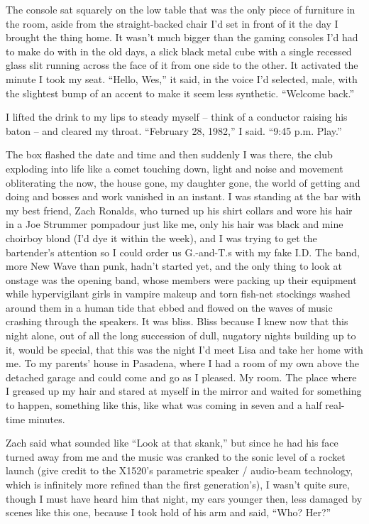 \documentclass[11pt,a4paper]{article}
\newcommand{\qm}[1]{“#1”}
\begin{document}
The console sat squarely on the low table that was the only piece of furniture in the room, aside from the straight-backed chair I'd set in front of it the day I brought the thing home. It wasn't much bigger than the gaming consoles I'd had to make do with in the old days, a slick black metal cube with a single recessed glass slit running across the face of it from one side to the other. It activated the minute I took my seat. \qm{Hello, Wes,} it said, in the voice I'd selected, male, with the slightest bump of an accent to make it seem less synthetic. \qm{Welcome back.}

I lifted the drink to my lips to steady myself – think of a conductor raising his baton – and cleared my throat. \qm{February 28, 1982,} I said. \qm{9:45 p.m. Play.}

The box flashed the date and time and then suddenly I was there, the club exploding into life like a comet touching down, light and noise and movement obliterating the now, the house gone, my daughter gone, the world of getting and doing and bosses and work vanished in an instant. I was standing at the bar with my best friend, Zach Ronalds, who turned up his shirt collars and wore his hair in a Joe Strummer pompadour just like me, only his hair was black and mine choirboy blond (I'd dye it within the week), and I was trying to get the bartender's attention so I could order us G.-and-T.s with my fake I.D. The band, more New Wave than punk, hadn't started yet, and the only thing to look at onstage was the opening band, whose members were packing up their equipment while hypervigilant girls in vampire makeup and torn fish-net stockings washed around them in a human tide that ebbed and flowed on the waves of music crashing through the speakers. It was bliss. Bliss because I knew now that this night alone, out of all the long succession of dull, nugatory nights building up to it, would be special, that this was the night I'd meet Lisa and take her home with me. To my parents' house in Pasadena, where I had a room of my own above the detached garage and could come and go as I pleased. My room. The place where I greased up my hair and stared at myself in the mirror and waited for something to happen, something like this, like what was coming in seven and a half real-time minutes.

Zach said what sounded like \qm{Look at that skank,} but since he had his face turned away from me and the music was cranked to the sonic level of a rocket launch (give credit to the X1520's parametric speaker / audio-beam technology, which is infinitely more refined than the first generation's), I wasn't quite sure, though I must have heard him that night, my ears younger then, less damaged by scenes like this one, because I took hold of his arm and said, \qm{Who? Her?}
\end{document}
